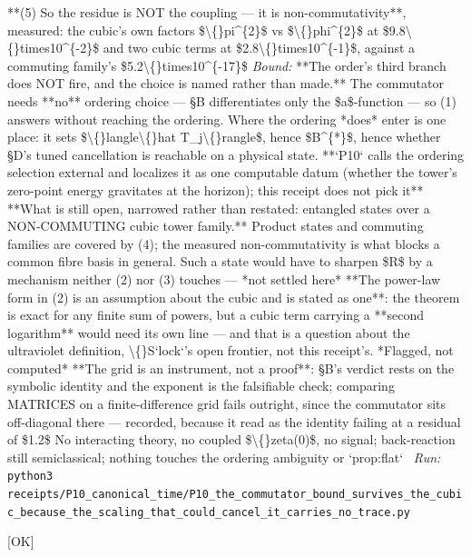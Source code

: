 \begin{description}
**(5) So the residue is NOT the coupling --- it is non-commutativity**, measured: the cubic's own factors \$\textbackslash\{\}pi\textasciicircum{}\{2\}\$ vs \$\textbackslash\{\}phi\textasciicircum{}\{2\}\$ at \$9.8\textbackslash\{\}times10\textasciicircum{}\{-2\}\$ and two cubic terms at \$2.8\textbackslash\{\}times10\textasciicircum{}\{-1\}\$, against a commuting family's \$5.2\textbackslash\{\}times10\textasciicircum{}\{-17\}\$
 \emph{Bound:}  **The order's third branch does NOT fire, and the choice is named rather than made.** The commutator needs **no** ordering choice --- \S{}B differentiates only the \$a\$-function --- so (1) answers without reaching the ordering. Where the ordering *does* enter is one place: it sets \$\textbackslash\{\}langle\textbackslash\{\}hat T\_j\textbackslash\{\}rangle\$, hence \$B\textasciicircum{}\{*\}\$, hence whether \S{}D's tuned cancellation is reachable on a physical state. **`P10` calls the ordering selection external and localizes it as one computable datum (whether the tower's zero-point energy gravitates at the horizon); this receipt does not pick it**  **What is still open, narrowed rather than restated: entangled states over a NON-COMMUTING cubic tower family.** Product states and commuting families are covered by (4); the measured non-commutativity is what blocks a common fibre basis in general. Such a state would have to sharpen \$R\$ by a mechanism neither (2) nor (3) touches --- *not settled here*  **The power-law form in (2) is an assumption about the cubic and is stated as one**: the theorem is exact for any finite sum of powers, but a cubic term carrying a **second logarithm** would need its own line --- and that is a question about the ultraviolet definition, \textbackslash\{\}S`lock`'s open frontier, not this receipt's. *Flagged, not computed*  **The grid is an instrument, not a proof**: \S{}B's verdict rests on the symbolic identity and the exponent is the falsifiable check; comparing MATRICES on a finite-difference grid fails outright, since the commutator sits off-diagonal there --- recorded, because it read as the identity failing at a residual of \$1.2\$  No interacting theory, no coupled \$\textbackslash\{\}zeta(0)\$, no signal; back-reaction still semiclassical; nothing touches the ordering ambiguity or `prop:flat`
\ \emph{Run:} \texttt{python3 receipts/P10\_canonical\_time/P10\_the\_commutator\_bound\_survives\_the\_cubic\_because\_the\_scaling\_that\_could\_cancel\_it\_carries\_no\_trace.py}
\item[\rcptlabel{P10_the_second_logarithm_holes_the_mechanism_and_not_the_conclusion_because_the_leading_log_is_unpartnered}{P10R28}\textbf{P10R28}\quad\texttt{P10\_the\_second\_logarithm\_holes\_the\_mechanism\_and\_not\_the\_conclusion\_because\_the\_leading\_log\_is\_unpartnered}]\hfill\textsf{[OK]}\\

\end{description}
